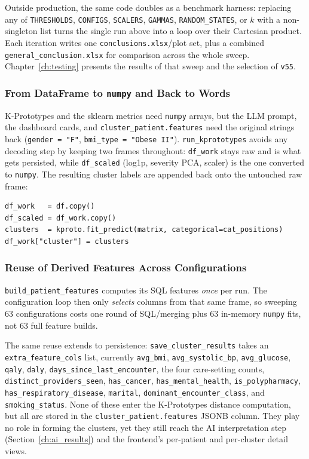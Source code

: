 Outside production, the same code doubles as a benchmark harness: replacing any of \texttt{THRESHOLDS}, \texttt{CONFIGS}, \texttt{SCALERS}, \texttt{GAMMAS}, \texttt{RANDOM\_STATES}, or $k$ with a non-singleton list turns the single run above into a loop over their Cartesian product. Each iteration writes one \texttt{conclusions.xlsx}/plot set, plus a combined \texttt{general\_conclusion.xlsx} for comparison across the whole sweep. Chapter~\ref{ch:testing} presents the results of that sweep and the selection of \texttt{v55}.

\subsubsection*{From DataFrame to \texttt{numpy} and Back to Words}

K-Prototypes and the sklearn metrics need \texttt{numpy} arrays, but the LLM prompt, the dashboard cards, and \texttt{cluster\_patient.features} need the original strings back (\texttt{gender = "F"}, \texttt{bmi\_type = "Obese II"}). \texttt{run\_kprototypes} avoids any decoding step by keeping two frames throughout: \texttt{df\_work} stays raw and is what gets persisted, while \texttt{df\_scaled} (log1p, severity PCA, scaler) is the one converted to \texttt{numpy}. The resulting cluster labels are appended back onto the untouched raw frame:

\begin{lstlisting}[style=pythonstyle]
df_work   = df.copy()
df_scaled = df_work.copy()
clusters  = kproto.fit_predict(matrix, categorical=cat_positions)
df_work["cluster"] = clusters
\end{lstlisting}

\subsubsection*{Reuse of Derived Features Across Configurations}

\texttt{build\_patient\_features} computes its SQL features \emph{once} per run. The configuration loop then only \emph{selects} columns from that same frame, so sweeping 63 configurations costs one round of SQL/merging plus 63 in-memory \texttt{numpy} fits, not 63 full feature builds.

The same reuse extends to persistence: \texttt{save\_cluster\_results} takes an \texttt{extra\_feature\_cols} list, currently \texttt{avg\_bmi}, \texttt{avg\_systolic\_bp}, \texttt{avg\_glucose}, \texttt{qaly}, \texttt{daly}, \texttt{days\_since\_last\_encounter}, the four care-setting counts, \texttt{distinct\_providers\_seen}, \texttt{has\_cancer}, \texttt{has\_mental\_health}, \texttt{is\_polypharmacy}, \texttt{has\_respiratory\_disease}, \texttt{marital}, \texttt{dominant\_encounter\_class}, and \texttt{smoking\_status}. None of these enter the K-Prototypes distance computation, but all are stored in the \texttt{cluster\_patient.features} JSONB column. They play no role in forming the clusters, yet they still reach the AI interpretation step (Section~\ref{ch:ai_results}) and the frontend's per-patient and per-cluster detail views.

